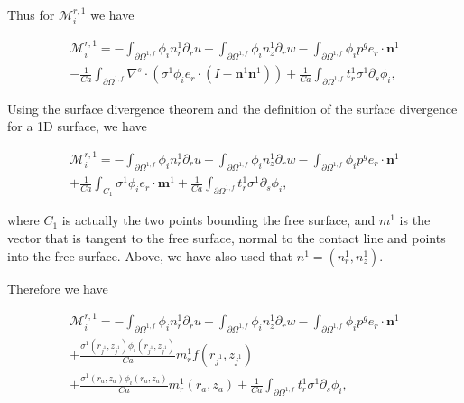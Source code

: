 \documentclass{article}
\begin{document}
Thus for \(\mathcal{M}_i^{r,1}\) we have

\begin{equation}
\begin{array}{l}{\mathcal{M}_{i}^{r,1} = -\int_{\partial \Omega^{1,f}}\phi_{i}n_{r}^{1}\partial_{r}u - \int_{\partial \Omega^{1,f}}\phi_{i}n_{z}^{1}\partial_{r}w - \int_{\partial \Omega^{1,f}}\phi_{i}p^{g}e_{r}\cdot \pmb{n}^{1}}\\ {-\frac{1}{Ca}\int_{\partial \Omega^{1,f}}\nabla^{s}\cdot (\sigma^{1}\phi_{i}e_{r}\cdot (I - \pmb{n}^{1}\pmb{n}^{1})) + \frac{1}{Ca}\int_{\partial \Omega^{1,f}}t_{r}^{1}\sigma^{1}\partial_{s}\phi_{i},} \end{array} \tag{4.34}
\end{equation}

Using the surface divergence theorem and the definition of the surface divergence for a 1D surface, we have

\begin{equation}
\begin{array}{l}{\mathcal{M}_{i}^{r,1} = -\int_{\partial \Omega^{1,f}}\phi_{i}n_{r}^{1}\partial_{r}u - \int_{\partial \Omega^{1,f}}\phi_{i}n_{z}^{1}\partial_{r}w - \int_{\partial \Omega^{1,f}}\phi_{i}p^{g}e_{r}\cdot \pmb{n}^{1}}\\ {+\frac{1}{Ca}\int_{C_{1}}\sigma^{1}\phi_{i}e_{r}\cdot \pmb{m}^{1} + \frac{1}{Ca}\int_{\partial \Omega^{1,f}}t_{r}^{1}\sigma^{1}\partial_{s}\phi_{i},} \end{array} \tag{4.35}
\end{equation}

where \(C_1\) is actually the two points bounding the free surface, and \(m^1\) is the vector that is tangent to the free surface, normal to the contact line and points into the free surface. Above, we have also used that \(n^1 = (n_r^1, n_z^1)\).

Therefore we have

\begin{equation}
\begin{array}{l}{\mathcal{M}_{i}^{r,1} = -\int_{\partial \Omega^{1,f}}\phi_{i}n_{r}^{1}\partial_{r}u - \int_{\partial \Omega^{1,f}}\phi_{i}n_{z}^{1}\partial_{r}w - \int_{\partial \Omega^{1,f}}\phi_{i}p^{g}e_{r}\cdot \pmb{n}^{1}}\\ {+\frac{\sigma^{1}(r_{j^{1}},z_{j^{1}})\phi_{i}(r_{j^{1}},z_{j^{1}})}{Ca} m_{r}^{1}f(r_{j^{1}},z_{j^{1}})}\\ {+\frac{\sigma^{1}(r_{a},z_{a})\phi_{i}(r_{a},z_{a})}{Ca} m_{r}^{1}(r_{a},z_{a}) + \frac{1}{Ca}\int_{\partial \Omega^{1,f}}t_{r}^{1}\sigma^{1}\partial_{s}\phi_{i},} \end{array} \tag{4.36}
\end{equation}
\end{document}
